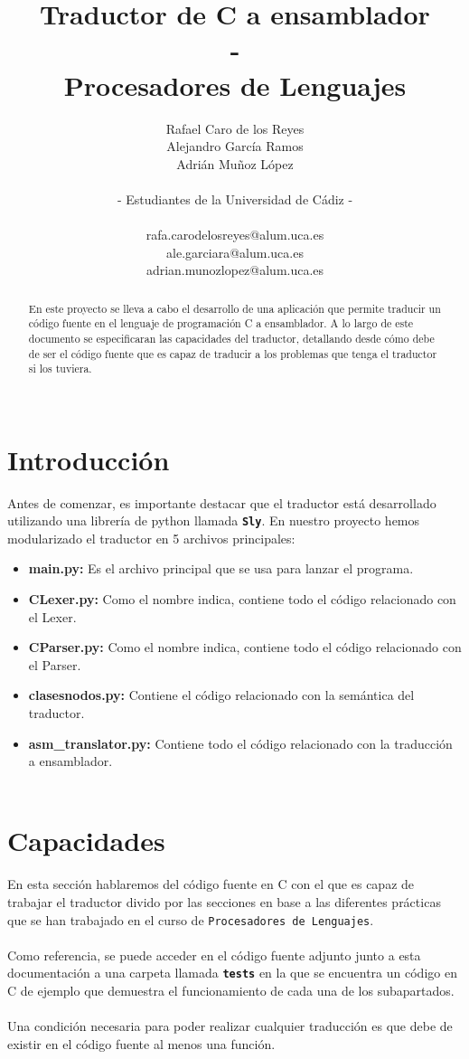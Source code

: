 \documentclass[]{article}
\title{\textbf{Traductor de C a ensamblador \\ - \\ Procesadores de Lenguajes}}
\author{Rafael Caro de los Reyes \\ Alejandro García Ramos \\ Adrián Muñoz López \\\\ - Estudiantes de la Universidad de Cádiz - \\\\ rafa.carodelosreyes@alum.uca.es \\ ale.garciara@alum.uca.es \\ adrian.munozlopez@alum.uca.es}
\begin{document}
	
	\maketitle
	
	\begin{abstract}
	En este proyecto se lleva a cabo el desarrollo de una aplicación que permite traducir un código fuente en el lenguaje de programación C a ensamblador. A lo largo de este documento se especificaran las capacidades del traductor, detallando desde cómo debe de ser el código fuente que es capaz de traducir a los problemas que tenga el traductor si los tuviera.\\ \\
	\end{abstract}
	
	\section{Introducción}
        Antes de comenzar, es importante destacar que el traductor está desarrollado utilizando una librería de python llamada \texttt{\textbf{Sly}}. En nuestro proyecto hemos modularizado el traductor en 5 archivos principales: \\ \begin{itemize}
        \item \textbf{main.py:} Es el archivo principal que se usa para lanzar el programa.
        \item \textbf{CLexer.py:} Como el nombre indica, contiene todo el código relacionado con el Lexer.
        \item \textbf{CParser.py:} Como el nombre indica, contiene todo el código relacionado con el Parser.
        \item \textbf{clasesnodos.py:} Contiene el código relacionado con la semántica del traductor.
        \item \textbf{asm\_{translator.py:}} Contiene todo el código relacionado con la traducción a ensamblador. \\ \\
        \end{itemize}

        \section{Capacidades}
        En esta sección hablaremos del código fuente en C con el que es capaz de trabajar el traductor divido por las secciones en base a las diferentes prácticas que se han trabajado en el curso de \texttt{Procesadores de Lenguajes}. \\\\ Como referencia, se puede acceder en el código fuente adjunto junto a esta documentación a una carpeta llamada \texttt{\textbf{tests}} en la que se encuentra un código en C de ejemplo que demuestra el funcionamiento de cada una de los subapartados. \\\\ Una condición necesaria para poder realizar cualquier traducción es que debe de existir en el código fuente al menos una función.
        
\end{document}
